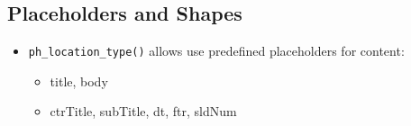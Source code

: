 \documentclass[
]{book}
\providecommand{\tightlist}{%
  \setlength{\itemsep}{0pt}\setlength{\parskip}{0pt}}
\begin{document}
\hypertarget{placeholders-and-shapes}{%
\subsection{Placeholders and Shapes}\label{placeholders-and-shapes}}

\begin{itemize}
\tightlist
\item
  \texttt{ph\_location\_type()} allows use predefined placeholders for content:

  \begin{itemize}
  \tightlist
  \item
    title, body
  \item
    ctrTitle, subTitle, dt, ftr, sldNum
  \end{itemize}
\end{itemize}
\end{document}
